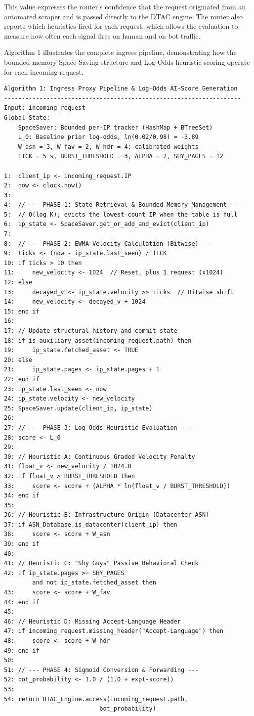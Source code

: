 This value expresses the router's confidence that the request originated from an automated scraper and is passed directly to the DTAC engine. The router also reports which heuristics fired for each request, which allows the evaluation to measure how often each signal fires on human and on bot traffic.

Algorithm 1 illustrates the complete ingress pipeline, demonstrating how the bounded-memory Space-Saving structure and Log-Odds heuristic scoring operate for each incoming request.

\begin{verbatim}
Algorithm 1: Ingress Proxy Pipeline & Log-Odds AI-Score Generation
-------------------------------------------------------------------
Input: incoming_request
Global State:
    SpaceSaver: Bounded per-IP tracker (HashMap + BTreeSet)
    L_0: Baseline prior log-odds, ln(0.02/0.98) = -3.89
    W_asn = 3, W_fav = 2, W_hdr = 4: calibrated weights
    TICK = 5 s, BURST_THRESHOLD = 3, ALPHA = 2, SHY_PAGES = 12

1:  client_ip <- incoming_request.IP
2:  now <- clock.now()
3:
4:  // --- PHASE 1: State Retrieval & Bounded Memory Management ---
5:  // O(log K); evicts the lowest-count IP when the table is full
6:  ip_state <- SpaceSaver.get_or_add_and_evict(client_ip)
7:
8:  // --- PHASE 2: EWMA Velocity Calculation (Bitwise) ---
9:  ticks <- (now - ip_state.last_seen) / TICK
10: if ticks > 10 then
11:     new_velocity <- 1024  // Reset, plus 1 request (x1024)
12: else
13:     decayed_v <- ip_state.velocity >> ticks  // Bitwise shift
14:     new_velocity <- decayed_v + 1024
15: end if
16:
17: // Update structural history and commit state
18: if is_auxiliary_asset(incoming_request.path) then
19:     ip_state.fetched_asset <- TRUE
20: else
21:     ip_state.pages <- ip_state.pages + 1
22: end if
23: ip_state.last_seen <- now
24: ip_state.velocity <- new_velocity
25: SpaceSaver.update(client_ip, ip_state)
26:
27: // --- PHASE 3: Log-Odds Heuristic Evaluation ---
28: score <- L_0
29:
30: // Heuristic A: Continuous Graded Velocity Penalty
31: float_v <- new_velocity / 1024.0
32: if float_v > BURST_THRESHOLD then
33:     score <- score + (ALPHA * ln(float_v / BURST_THRESHOLD))
34: end if
35:
36: // Heuristic B: Infrastructure Origin (Datacenter ASN)
37: if ASN_Database.is_datacenter(client_ip) then
38:     score <- score + W_asn
39: end if
40:
41: // Heuristic C: "Shy Guys" Passive Behavioral Check
42: if ip_state.pages >= SHY_PAGES
        and not ip_state.fetched_asset then
43:     score <- score + W_fav
44: end if
45:
46: // Heuristic D: Missing Accept-Language Header
47: if incoming_request.missing_header("Accept-Language") then
48:     score <- score + W_hdr
49: end if
50:
51: // --- PHASE 4: Sigmoid Conversion & Forwarding ---
52: bot_probability <- 1.0 / (1.0 + exp(-score))
53:
54: return DTAC_Engine.access(incoming_request.path,
                           bot_probability)
\end{verbatim}

